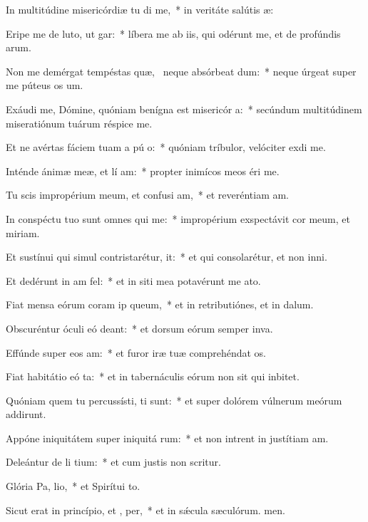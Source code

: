 \item In multitúdine misericórdiæ tu di me,~* in veritáte salútis æ:
\item Eripe me de luto, ut  gar:~* líbera me ab iis, qui odérunt me, et de profúndis arum.
\item Non me demérgat tempéstas quæ,~\pscross{} neque absórbeat  dum:~* neque úrgeat super me púteus os um.
\item Exáudi me, Dómine, quóniam benígna est misericór a:~* secúndum multitúdinem miseratiónum tuárum réspice  me.
\item Et ne avértas fáciem tuam a pú o:~* quóniam tríbulor, velóciter exdi me.
\item Inténde ánimæ meæ, et lí am:~* propter inimícos meos éri me.
\item Tu scis impropérium meum, et confusi am,~* et reveréntiam am.
\item In conspéctu tuo sunt omnes qui  me:~* impropérium exspectávit cor meum, et miriam.
\item Et sustínui qui simul contristarétur,   it:~* et qui consolarétur, et non inni.
\item Et dedérunt in  am fel:~* et in siti mea potavérunt me ato.
\item Fiat mensa eórum coram ip  queum,~* et in retributiónes, et in dalum.
\item Obscuréntur óculi eó  deant:~* et dorsum eórum semper inva.
\item Effúnde super eos  am:~* et furor iræ tuæ comprehéndat os.
\item Fiat habitátio eó ta:~* et in tabernáculis eórum non sit qui inbitet.
\item Quóniam quem tu percussísti, ti sunt:~* et super dolórem vúlnerum meórum addirunt.
\item Appóne iniquitátem super iniquitá rum:~* et non intrent in justítiam am.
\item Deleántur de li tium:~* et cum justis non scritur.
\item Glória Pa,  lio,~* et Spirítui to.
\item Sicut erat in princípio, et ,  per,~* et in sǽcula sæculórum. men.
